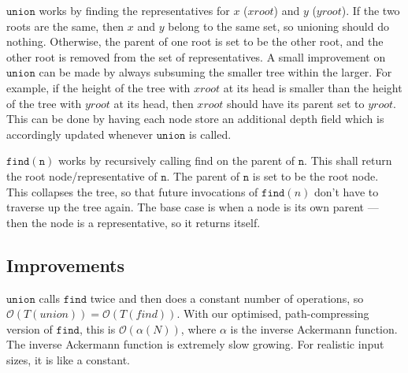 \documentclass[a4paper,12pt]{article}
\newcommand{\kwa}[1]{\mathtt{#1}}
\begin{document}
\noindent
$\kwa{union}$ works by finding the representatives for $x$ ($xroot$) and $y$ ($yroot$). If the two roots are the same, then $x$ and $y$ belong to the same set, so unioning should do nothing. Otherwise, the parent of one root is set to be the other root, and the other root is removed from the set of representatives. A small improvement on $\kwa{union}$ can be made by always subsuming the smaller tree within the larger. For example, if the height of the tree with $xroot$ at its head is smaller than the height of the tree with $yroot$ at its head, then $xroot$ should have its parent set to $yroot$. This can be done by having each node store an additional depth field which is accordingly updated whenever $\kwa{union}$ is called.

$\kwa{find(n)}$ works by recursively calling find on the parent of $\kwa{n}$. This shall return the root node/representative of $\kwa{n}$. The parent of $\kwa{n}$ is set to be the root node. This collapses the tree, so that future invocations of $\kwa{find}(n)$ don't have to traverse up the tree again. The base case is when a node is its own parent --- then the node is a representative, so it returns itself.


\subsection{Improvements}

$\kwa{union}$ calls $\kwa{find}$ twice and then does a constant number of operations, so $\mathcal{O}(T(union)) = \mathcal{O}(T(find))$. With our optimised, path-compressing version of $\kwa{find}$, this is $\mathcal{O}(\alpha(N))$, where $\alpha$ is the inverse Ackermann function. The inverse Ackermann function is extremely slow growing. For realistic input sizes, it is like a constant.
\end{document}
